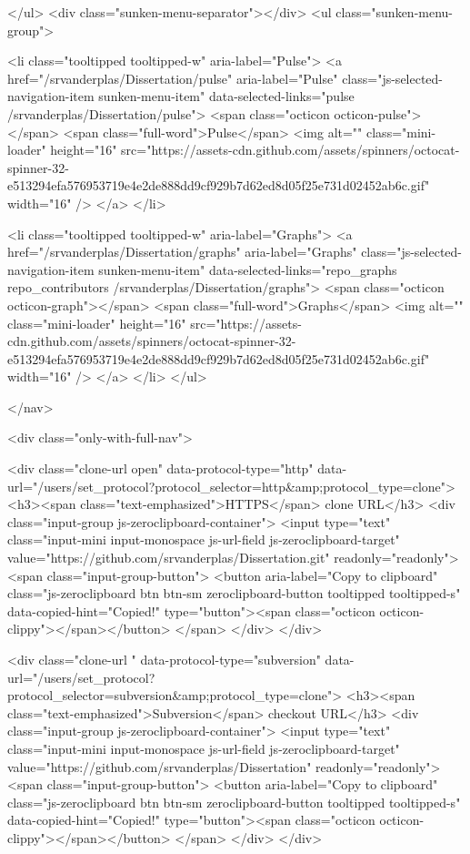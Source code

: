   </ul>
  <div class="sunken-menu-separator"></div>
  <ul class="sunken-menu-group">

    <li class="tooltipped tooltipped-w" aria-label="Pulse">
      <a href="/srvanderplas/Dissertation/pulse" aria-label="Pulse" class="js-selected-navigation-item sunken-menu-item" data-selected-links="pulse /srvanderplas/Dissertation/pulse">
        <span class="octicon octicon-pulse"></span> <span class="full-word">Pulse</span>
        <img alt="" class="mini-loader" height="16" src="https://assets-cdn.github.com/assets/spinners/octocat-spinner-32-e513294efa576953719e4e2de888dd9cf929b7d62ed8d05f25e731d02452ab6c.gif" width="16" />
</a>    </li>

    <li class="tooltipped tooltipped-w" aria-label="Graphs">
      <a href="/srvanderplas/Dissertation/graphs" aria-label="Graphs" class="js-selected-navigation-item sunken-menu-item" data-selected-links="repo_graphs repo_contributors /srvanderplas/Dissertation/graphs">
        <span class="octicon octicon-graph"></span> <span class="full-word">Graphs</span>
        <img alt="" class="mini-loader" height="16" src="https://assets-cdn.github.com/assets/spinners/octocat-spinner-32-e513294efa576953719e4e2de888dd9cf929b7d62ed8d05f25e731d02452ab6c.gif" width="16" />
</a>    </li>
  </ul>


</nav>

              <div class="only-with-full-nav">
                  
<div class="clone-url open"
  data-protocol-type="http"
  data-url="/users/set_protocol?protocol_selector=http&amp;protocol_type=clone">
  <h3><span class="text-emphasized">HTTPS</span> clone URL</h3>
  <div class="input-group js-zeroclipboard-container">
    <input type="text" class="input-mini input-monospace js-url-field js-zeroclipboard-target"
           value="https://github.com/srvanderplas/Dissertation.git" readonly="readonly">
    <span class="input-group-button">
      <button aria-label="Copy to clipboard" class="js-zeroclipboard btn btn-sm zeroclipboard-button tooltipped tooltipped-s" data-copied-hint="Copied!" type="button"><span class="octicon octicon-clippy"></span></button>
    </span>
  </div>
</div>

  
<div class="clone-url "
  data-protocol-type="subversion"
  data-url="/users/set_protocol?protocol_selector=subversion&amp;protocol_type=clone">
  <h3><span class="text-emphasized">Subversion</span> checkout URL</h3>
  <div class="input-group js-zeroclipboard-container">
    <input type="text" class="input-mini input-monospace js-url-field js-zeroclipboard-target"
           value="https://github.com/srvanderplas/Dissertation" readonly="readonly">
    <span class="input-group-button">
      <button aria-label="Copy to clipboard" class="js-zeroclipboard btn btn-sm zeroclipboard-button tooltipped tooltipped-s" data-copied-hint="Copied!" type="button"><span class="octicon octicon-clippy"></span></button>
    </span>
  </div>
</div>



